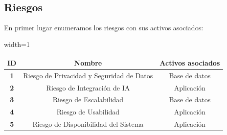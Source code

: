 \documentclass[a4paper,12pt]{article}
\begin{document}
    \subsection{Riesgos}
    \par En primer lugar enumeramos los riesgos con sus activos asociados:
    \begin{center}
        \begin{adjustbox}{width=1\textwidth}
            \begin{tabular}{ |c|c|c| }
                \hline
                \rowcolor{lightgray} \textbf{ID} & \textbf{Nombre} & \textbf{Activos asociados} \\
                \hline    
                \textbf{1} & Riesgo de Privacidad y Seguridad de Datos & Base de datos \\
                \hline
                \textbf{2} & Riesgo de Integración de IA & Aplicación \\
                \hline
                \textbf{3} & Riesgo de Escalabilidad & Base de datos \\
                \hline
                \textbf{4} & Riesgo de Usabilidad & Aplicación \\
                \hline
                \textbf{5} & Riesgo de Disponibilidad del Sistema & Aplicación \\
                \hline
            \end{tabular}
        \end{adjustbox}
    \end{center}
\end{document}
